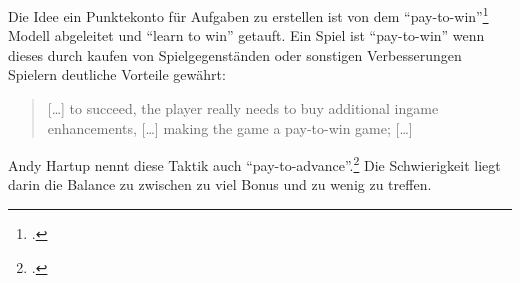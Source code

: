 	Die Idee ein Punktekonto für Aufgaben zu erstellen ist von dem \enquote{pay-to-win}\footcite{pay-to-win} Modell  abgeleitet und \enquote{learn to win} getauft.
	Ein Spiel ist \enquote{pay-to-win} wenn dieses durch kaufen von Spielgegenständen oder sonstigen Verbesserungen Spielern deutliche Vorteile gewährt:
	\begin{quote}
		\vspace{\baselineskip}\hfill\begin{minipage}{0.96\textwidth}
			[\dots] to succeed, the player really needs to buy additional ingame enhancements, [\dots] making the game a pay-to-win game; [\dots]
		\end{minipage}
	\end{quote}
	Andy Hartup nennt diese Taktik auch \enquote{pay-to-advance}.\footcite{free-to-play_is_pay-to-win} Die Schwierigkeit liegt darin die Balance zu zwischen zu viel Bonus und zu wenig zu treffen.

